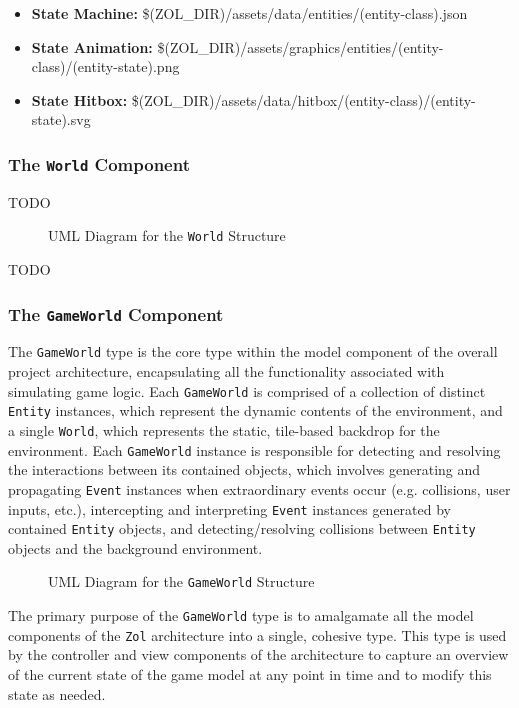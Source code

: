 \documentclass{article}
\newcommand{\classname}[1] {\texttt{#1}}
\newcommand{\projectname}[0] {\texttt{Zol} }
\newcommand{\insertdiagram}[2]
{
	\begin{figure}[H]
		\centering
		\fbox{\texttt{[image: figures/\#1]}}
		\caption{UML Diagram for the \classname{#1} Structure}
	\end{figure}
}
\begin{document}
			\begin{itemize}
				\item \textbf{State Machine:} \$(ZOL\_DIR)/assets/data/entities/(entity-class).json
				\item \textbf{State Animation:} \$(ZOL\_DIR)/assets/graphics/entities/(entity-class)/(entity-state).png
				\item \textbf{State Hitbox:} \$(ZOL\_DIR)/assets/data/hitbox/(entity-class)/(entity-state).svg
			\end{itemize}

			\subsubsection[\classname{World}]{The \classname{World} Component}
			TODO

			\insertdiagram{World}{2.0in}

			TODO

			\subsubsection[\classname{GameWorld}]{The \classname{GameWorld} Component}
			The \classname{GameWorld} type is the core type within the model
			component of the overall project architecture, encapsulating all
			the functionality associated with simulating game logic.  Each
			\classname{GameWorld} is comprised of a collection of distinct
			\classname{Entity} instances, which represent the dynamic contents
			of the environment, and a single \classname{World}, which represents
			the static, tile-based backdrop for the environment.  Each \classname{GameWorld} instance
			is responsible for detecting and resolving the interactions between
			its contained objects, which involves generating and propagating
			\classname{Event} instances when extraordinary events occur (e.g.
			collisions, user inputs, etc.), intercepting and interpreting
			\classname{Event} instances generated by contained \classname{Entity}
			objects, and detecting/resolving collisions between \classname{Entity}
			objects and the background environment.

			\insertdiagram{GameWorld}{3.0in}

			The primary purpose of the \classname{GameWorld} type is to amalgamate
			all the model components of the \projectname architecture into a
			single, cohesive type.  This type is used by the controller and view
			components of the architecture to capture an overview of the current
			state of the game model at any point in time and to modify this state
			as needed.
\end{document}
